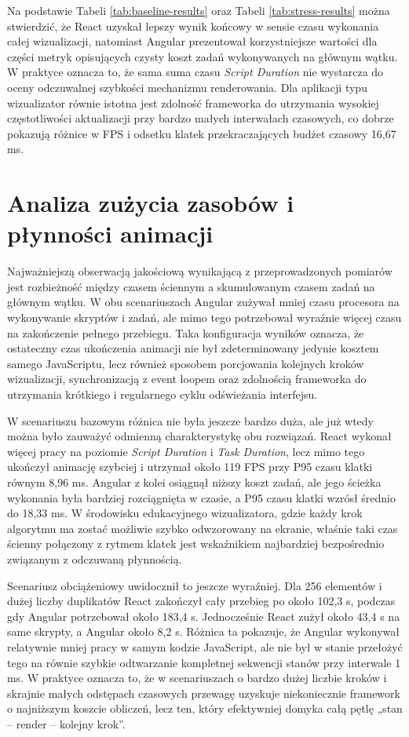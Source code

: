 \documentclass[12pt,openright,twoside]{report}
\begin{document}
Na podstawie Tabeli \ref{tab:baseline-results} oraz Tabeli \ref{tab:stress-results} można stwierdzić, że React uzyskał lepszy wynik końcowy w sensie czasu wykonania całej wizualizacji, natomiast Angular prezentował korzystniejsze wartości dla części metryk opisujących czysty koszt zadań wykonywanych na głównym wątku. W praktyce oznacza to, że sama suma czasu \textit{Script Duration} nie wystarcza do oceny odczuwalnej szybkości mechanizmu renderowania. Dla aplikacji typu wizualizator równie istotna jest zdolność frameworka do utrzymania wysokiej częstotliwości aktualizacji przy bardzo małych interwałach czasowych, co dobrze pokazują różnice w FPS i odsetku klatek przekraczających budżet czasowy 16,67 ms.

\section{Analiza zużycia zasobów i płynności animacji}
Najważniejszą obserwacją jakościową wynikającą z przeprowadzonych pomiarów jest rozbieżność między czasem ściennym a skumulowanym czasem zadań na głównym wątku. W obu scenariuszach Angular zużywał mniej czasu procesora na wykonywanie skryptów i zadań, ale mimo tego potrzebował wyraźnie więcej czasu na zakończenie pełnego przebiegu. Taka konfiguracja wyników oznacza, że ostateczny czas ukończenia animacji nie był zdeterminowany jedynie kosztem samego JavaScriptu, lecz również sposobem porcjowania kolejnych kroków wizualizacji, synchronizacją z event loopem oraz zdolnością frameworka do utrzymania krótkiego i regularnego cyklu odświeżania interfejsu.

W scenariuszu bazowym różnica nie była jeszcze bardzo duża, ale już wtedy można było zauważyć odmienną charakterystykę obu rozwiązań. React wykonał więcej pracy na poziomie \textit{Script Duration} i \textit{Task Duration}, lecz mimo tego ukończył animację szybciej i utrzymał około 119 FPS przy P95 czasu klatki równym 8,96 ms. Angular z kolei osiągnął niższy koszt zadań, ale jego ścieżka wykonania była bardziej rozciągnięta w czasie, a P95 czasu klatki wzrósł średnio do 18,33 ms. W środowisku edukacyjnego wizualizatora, gdzie każdy krok algorytmu ma zostać możliwie szybko odwzorowany na ekranie, właśnie taki czas ścienny połączony z rytmem klatek jest wskaźnikiem najbardziej bezpośrednio związanym z odczuwaną płynnością.

Scenariusz obciążeniowy uwidocznił to jeszcze wyraźniej. Dla 256 elementów i dużej liczby duplikatów React zakończył cały przebieg po około 102,3 s, podczas gdy Angular potrzebował około 183,4 s. Jednocześnie React zużył około 43,4 s na same skrypty, a Angular około 8,2 s. Różnica ta pokazuje, że Angular wykonywał relatywnie mniej pracy w samym kodzie JavaScript, ale nie był w stanie przełożyć tego na równie szybkie odtwarzanie kompletnej sekwencji stanów przy interwale 1 ms. W praktyce oznacza to, że w scenariuszach o bardzo dużej liczbie kroków i skrajnie małych odstępach czasowych przewagę uzyskuje niekoniecznie framework o najniższym koszcie obliczeń, lecz ten, który efektywniej domyka całą pętlę „stan -- render -- kolejny krok”.
\end{document}
